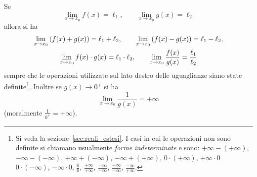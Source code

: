\begin{theorem}
  \label{th:operazioni_limiti}%
\mymark{***}%
Se
\[
  \lim_{x\to x_0}f(x) = \ell_1,\qquad
  \lim_{x\to x_0}g(x) = \ell_2
\]
allora si ha
\begin{gather*}
  \lim_{x\to x_0} {\left( f(x) + g(x) \right)} = \ell_1 + \ell_2, \qquad
  \lim_{x\to x_0} {\left( f(x) - g(x) \right)} = \ell_1 - \ell_2, \\
  \lim_{x\to x_0} f(x)\cdot g(x) = \ell_1 \cdot \ell_2, \qquad
  \lim_{x\to x_0} \frac{f(x)}{g(x)} = \frac{\ell_1}{\ell_2}
\end{gather*}
sempre che le operazioni utilizzate sul lato destro delle uguaglianze
siano state definite\footnote{%
Si veda la sezione~\ref{sec:reali_estesi}.
I casi in cui le operazioni non sono definite si chiamano 
usualmente \emph{forme indeterminate}
e sono: $+\infty - (+\infty)$, 
$-\infty - (-\infty)$, $+\infty + (-\infty)$, 
$-\infty + (+\infty)$, $0\cdot (+\infty)$, $+\infty \cdot 0$
$0\cdot (-\infty)$, $-\infty \cdot 0$, $\frac 0 0$,
$\frac{+\infty}{+\infty}$, $\frac{-\infty}{-\infty}$,
$\frac{+\infty}{-\infty}$, $\frac{-\infty}{+\infty}$. 
}.
Inoltre se $g(x)\to 0^+$ 
si ha
\[
    \lim_{x\to x_0} \frac{1}{g(x)} = +\infty
\]
(moralmente $\frac{1}{0^+} = +\infty$).
\end{theorem}
%
